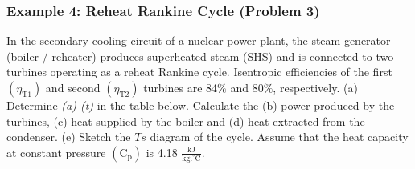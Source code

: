 \documentclass[10pt,compress,handout,ignorenonframetext]{beamer}
\begin{document}
\begin{frame}
 \frametitle{Example 4: Reheat Rankine Cycle (Problem 3)}
    \scriptsize In the secondary cooling circuit of a nuclear power plant, the steam generator (boiler / reheater) produces superheated steam (SHS) and is connected to two turbines operating as a reheat Rankine cycle. Isentropic efficiencies of the first $\left(\eta_{\text{T1}}\right)$ and second $\left(\eta_{\text{T2}}\right)$ turbines are 84$\%$ and 80$\%$, respectively. (a) Determine {\it (a)-(t)} in the table below. Calculate the (b) power produced by the turbines, (c) heat supplied by the boiler and (d) heat extracted from the condenser. (e) Sketch the $Ts$ diagram of the cycle. Assume that the heat capacity at constant pressure $\left(\text{C}_{\text{p}}\right)$ is 4.18 $\frac{\text{kJ}}{\text{kg.}^{\circ}\text{C}}$.


\end{frame}
\end{document}
